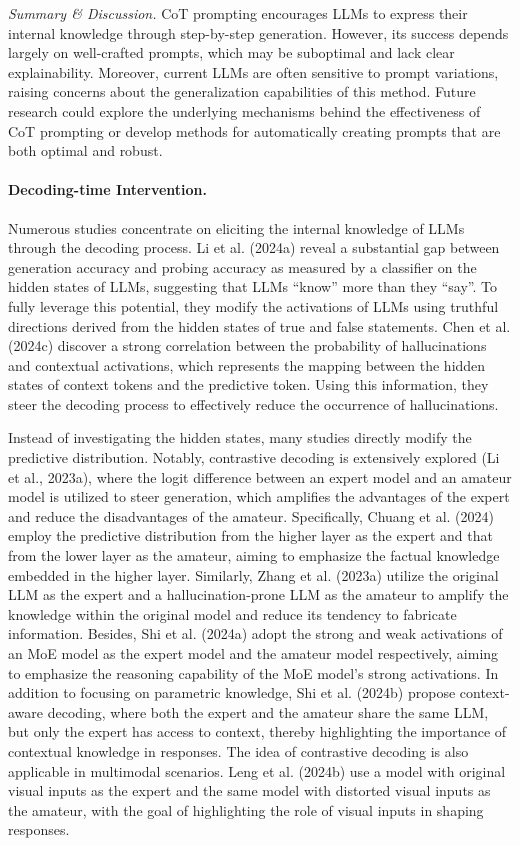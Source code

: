\emph{Summary \& Discussion.} CoT prompting encourages LLMs to express their internal knowledge through step-by-step generation. However, its success depends largely on well-crafted prompts, which may be suboptimal and lack clear explainability. Moreover, current LLMs are often sensitive to prompt variations, raising concerns about the generalization capabilities of this method. Future research could explore the underlying mechanisms behind the effectiveness of CoT prompting or develop methods for automatically creating prompts that are both optimal and robust.

\paragraph{Decoding-time Intervention.} Numerous studies concentrate on eliciting the internal knowledge of LLMs through the decoding process. Li et al. (2024a) reveal a substantial gap between generation accuracy and probing accuracy as measured by a classifier on the hidden states of LLMs, suggesting that LLMs ``know'' more than they ``say''. To fully leverage this potential, they modify the activations of LLMs using truthful directions derived from the hidden states of true and false statements. Chen et al. (2024c) discover a strong correlation between the probability of hallucinations and contextual activations, which represents the mapping between the hidden states of context tokens and the predictive token. Using this information, they steer the decoding process to effectively reduce the occurrence of hallucinations.

Instead of investigating the hidden states, many studies directly modify the predictive distribution. Notably, contrastive decoding is extensively explored (Li et al., 2023a), where the logit difference between an expert model and an amateur model is utilized to steer generation, which amplifies the advantages of the expert and reduce the disadvantages of the amateur. Specifically, Chuang et al. (2024) employ the predictive distribution from the higher layer as the expert and that from the lower layer as the amateur, aiming to emphasize the factual knowledge embedded in the higher layer. Similarly, Zhang et al. (2023a) utilize the original LLM as the expert and a hallucination-prone LLM as the amateur to amplify the knowledge within the original model and reduce its tendency to fabricate information. Besides, Shi et al. (2024a) adopt the strong and weak activations of an MoE model as the expert model and the amateur model respectively, aiming to emphasize the reasoning capability of the MoE model's strong activations. In addition to focusing on parametric knowledge, Shi et al. (2024b) propose context-aware decoding, where both the expert and the amateur share the same LLM, but only the expert has access to context, thereby highlighting the importance of contextual knowledge in responses. The idea of contrastive decoding is also applicable in multimodal scenarios. Leng et al. (2024b) use a model with original visual inputs as the expert and the same model with distorted visual inputs as the amateur, with the goal of highlighting the role of visual inputs in shaping responses.

